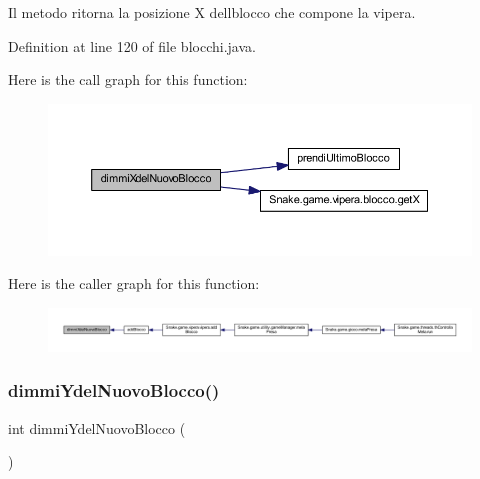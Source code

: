 Il metodo ritorna la posizione X dell\textquotesingle{}blocco che compone la vipera. 



Definition at line 120 of file blocchi.\+java.

Here is the call graph for this function\+:
\nopagebreak
\begin{figure}[H]
\begin{center}
\leavevmode
\includegraphics[width=350pt]{class_snake_1_1game_1_1vipera_1_1blocchi_afda852123016bddf1840fdb19241ffa3_cgraph}
\end{center}
\end{figure}
Here is the caller graph for this function\+:
\nopagebreak
\begin{figure}[H]
\begin{center}
\leavevmode
\includegraphics[width=350pt]{class_snake_1_1game_1_1vipera_1_1blocchi_afda852123016bddf1840fdb19241ffa3_icgraph}
\end{center}
\end{figure}
\mbox{\label{class_snake_1_1game_1_1vipera_1_1blocchi_a78a0129c937328d9bd0dafc68d007aef}} 
\subsubsection{\texorpdfstring{dimmi\+Ydel\+Nuovo\+Blocco()}{dimmiYdelNuovoBlocco()}}
{\footnotesize\ttfamily int dimmi\+Ydel\+Nuovo\+Blocco (\begin{DoxyParamCaption}{ }\end{DoxyParamCaption})\hspace{0.3cm}{\ttfamily [private]}}



